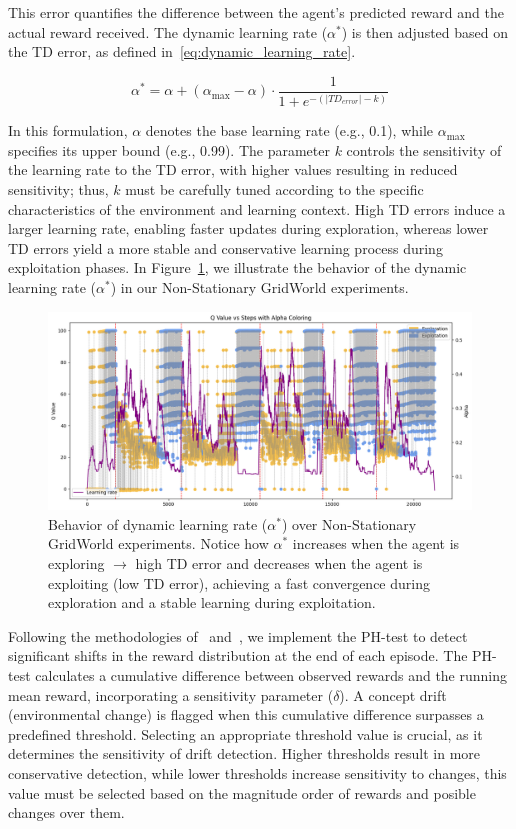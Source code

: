 This error quantifies the difference between the agent’s predicted reward and the actual reward received. The dynamic learning rate ($\alpha^*$) is then adjusted based on the TD error, as defined in~\eqref{eq:dynamic_learning_rate}.

\begin{equation}
    \label{eq:dynamic_learning_rate}
    \alpha^* = \alpha + (\alpha_{\max}-\alpha) \cdot \frac{1}{1 + e^{-(|TD_{error}|-k)}}
\end{equation}

In this formulation, $\alpha$ denotes the base learning rate (e.g., 0.1), while $\alpha_{\max}$ specifies its upper bound (e.g., 0.99). The parameter $k$ controls the sensitivity of the learning rate to the TD error, with higher values resulting in reduced sensitivity; thus, $k$ must be carefully tuned according to the specific characteristics of the environment and learning context. High TD errors induce a larger learning rate, enabling faster updates during exploration, whereas lower TD errors yield a more stable and conservative learning process during exploitation phases. In Figure~\ref{fig:alpha}, we illustrate the behavior of the dynamic learning rate ($\alpha^*$) in our Non-Stationary GridWorld experiments.

\begin{figure}
    \centering
    \includegraphics[width=\textwidth]{figures/alpha.png}
    \caption{Behavior of dynamic learning rate ($\alpha^*$) over Non-Stationary GridWorld experiments. Notice how $\alpha^*$ increases when the agent is exploring $\rightarrow$ high TD error and decreases when the agent is exploiting (low TD error), achieving a fast convergence during exploration and a stable learning during exploitation.}
    \label{fig:alpha}
\end{figure}

Following the methodologies of~\citet{mignon2017adaptive} and~\citet{networkdynamicrl}, we implement the PH-test to detect significant shifts in the reward distribution at the end of each episode. The PH-test calculates a cumulative difference between observed rewards and the running mean reward, incorporating a sensitivity parameter ($\delta$). A concept drift (environmental change) is flagged when this cumulative difference surpasses a predefined threshold. Selecting an appropriate threshold value is crucial, as it determines the sensitivity of drift detection. Higher thresholds result in more conservative detection, while lower thresholds increase sensitivity to changes, this value must be selected based on the magnitude order of rewards and posible changes over them.

